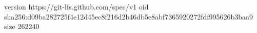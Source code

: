 version https://git-lfs.github.com/spec/v1
oid sha256:d09ba282725f4e12d45ec8f216d2b46db5e8abf7365920272fdf995626b3baa9
size 262240

